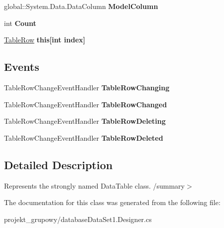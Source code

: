 \begin{DoxyCompactItemize}
global\+::\+System.\+Data.\+Data\+Column {\bfseries Model\+Column}
\item 
\mbox{\label{classprojekt__grupowy_1_1database_data_set1_1_1_table_data_table_a3b3df0db393872b770f569d6165a54f6}} 
int {\bfseries Count}
\item 
\mbox{\label{classprojekt__grupowy_1_1database_data_set1_1_1_table_data_table_abff84451373570e4edeb04360c8940c5}} 
\hyperlink{classprojekt__grupowy_1_1database_data_set1_1_1_table_row}{Table\+Row} {\bfseries this\mbox{[}int index\mbox{]}}
\end{DoxyCompactItemize}
\subsection*{Events}
\begin{DoxyCompactItemize}
\item 
\mbox{\label{classprojekt__grupowy_1_1database_data_set1_1_1_table_data_table_a95b49a5f2754ed9d77c5973161a3510b}} 
Table\+Row\+Change\+Event\+Handler {\bfseries Table\+Row\+Changing}
\item 
\mbox{\label{classprojekt__grupowy_1_1database_data_set1_1_1_table_data_table_a40baae85167732e87dbdf160f720c7e9}} 
Table\+Row\+Change\+Event\+Handler {\bfseries Table\+Row\+Changed}
\item 
\mbox{\label{classprojekt__grupowy_1_1database_data_set1_1_1_table_data_table_ae9f5743fb89ef52cefedcc9b89288ef0}} 
Table\+Row\+Change\+Event\+Handler {\bfseries Table\+Row\+Deleting}
\item 
\mbox{\label{classprojekt__grupowy_1_1database_data_set1_1_1_table_data_table_a769205cec3478233cddcf78dfee38fc2}} 
Table\+Row\+Change\+Event\+Handler {\bfseries Table\+Row\+Deleted}
\end{DoxyCompactItemize}


\subsection{Detailed Description}
Represents the strongly named Data\+Table class. /summary$>$ 

The documentation for this class was generated from the following file\+:\begin{DoxyCompactItemize}
\item 
projekt\+\_\+grupowy/database\+Data\+Set1.\+Designer.\+cs\end{DoxyCompactItemize}
